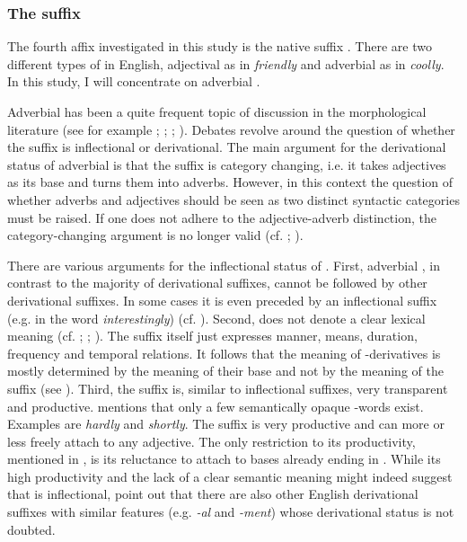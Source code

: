 \subsubsection{The suffix }\label{ly}

The fourth affix investigated in this study is the native suffix . There are two different types of  in English, adjectival  as in \textit{friendly} and adverbial  as in \textit{coolly}. In this study, I will concentrate on adverbial .

Adverbial  has been a quite frequent topic of discussion in the morphological literature (see for example \citealt{Zwicky.1995}; \citealt{Plag.2003}; \citealt{Giegerich.2012}; \citealt{Bauer.2013}). Debates revolve around the question of whether the suffix is inflectional or derivational. 
The main argument for the derivational status of adverbial  is that the suffix is category changing, i.e. it takes adjectives as its base and turns them into adverbs. However, in this context the question of whether adverbs and adjectives should be seen as two distinct syntactic categories must be raised. If one does not adhere to the adjective-adverb distinction, the category-changing argument is no longer valid (cf. \citealt[195]{Plag.2003}; \citealt{Giegerich.2012}).
	
There are various arguments for the inflectional status of . First, adverbial , in contrast to the majority of derivational suffixes, cannot be followed by other derivational suffixes. In some cases it is even preceded by an inflectional suffix (e.g. in the word \textit{interestingly}) (cf. \citealt{Giegerich.2012}).
Second,  does not denote a clear lexical meaning (cf. \citealt[195]{Plag.2003}; \citealt{Giegerich.2012}; \citealt[324]{Bauer.2013}). The suffix itself just expresses manner, means, duration, frequency and temporal relations. It follows that the meaning of -derivatives is mostly determined by the meaning of their base and not by the meaning of the suffix (see \citealt[326 f]{Bauer.2013}). 
Third, the suffix  is, similar to inflectional suffixes, very transparent and productive. \citet[196]{Plag.2003} mentions that only a few semantically opaque -words exist. Examples are \textit{hardly} and \textit{shortly}. 
The suffix is very productive and can more or less freely attach to any adjective. The only restriction to its productivity, mentioned in \citet[334]{Bauer.2013}, is its reluctance to attach to bases already ending in .
While its high productivity and the lack of a clear semantic meaning might indeed suggest that  is inflectional, \citet[324]{Bauer.2013} point out that there are also other English derivational suffixes with similar features (e.g. \textit{-al} and \textit{-ment}) whose derivational status is not doubted. 
 
